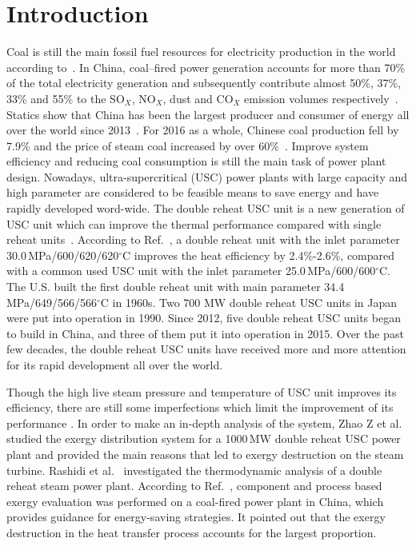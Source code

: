 \documentclass[preprint,12pt]{elsarticle}
\begin{document}
\begin{multicols}{2}
\printnomenclature[1.5cm]{}
\end{multicols}



\section{Introduction}
\label{sec1:intro}
Coal is still the main fossil fuel resources for electricity production in the world according to~\cite{Ouedraogo2013Energy}. 
In China, coal–fired power generation accounts for more than 70\% of the total electricity generation and subsequently contribute almost 50\%, 37\%, 33\% and 55\% to the SO$_X$, NO$_X$, dust and CO$_X$ emission volumes respectively~\cite{Zhang2010Analysis}.
Statics show that China has been the largest producer and consumer of energy all over the world since 2013~\cite{Petroleum2014BP}. 
For 2016 as a whole, Chinese coal production fell by 7.9\% and the price of steam coal increased by over 60\%~\cite{Petroleum2017BP}. 
Improve system efficiency and reducing coal consumption is still the main task of power plant design. Nowadays, ultra-supercritical (USC) power plants with large capacity and high parameter are considered to be feasible means to save energy and have rapidly developed word-wide.
The double reheat USC unit is a new generation of USC unit which can improve the thermal performance compared with single reheat units~\cite{Zhao2017Exergy}. 
According to Ref.~\cite{Zhao2017Exergy}, a double reheat unit with the inlet parameter 30.0\,MPa/600/620/620$^\circ$C improves the heat efficiency by 2.4\%-2.6\%, compared with a common used USC unit with the inlet parameter 25.0\,MPa/600/600$^\circ$C.
 The U.S. built the first double reheat unit with main parameter 34.4 MPa/649/566/566$^\circ$C in 1960s.
 Two 700 MW double reheat USC units in Japan were put into operation in 1990. 
 Since 2012, five  double reheat USC units  began to build in China, and three of them put it into operation in 2015.
 Over the past few decades, the double reheat USC units have received more and more attention for its rapid development all over the world.

  

Though the high live steam pressure and temperature of USC unit improves its efficiency, there are still some imperfections which limit the improvement of its performance . 
In order to make an in-depth analysis of the system, Zhao Z et al.~\cite{Zhao2017Exergy} studied the exergy distribution system for a 1000\,MW double reheat USC power plant and provided the main reasons that led to exergy destruction on the steam turbine.
Rashidi et al.~\cite{Rashidi2014Thermodynamic} investigated the thermodynamic analysis of a double reheat steam power plant.
According to Ref.~\cite{Wu2014Component}, component and process based exergy evaluation was performed on a coal-fired power plant in China, which provides guidance for energy-saving strategies.
It pointed out that the exergy destruction in the heat transfer process accounts for the largest proportion.
\end{document}
